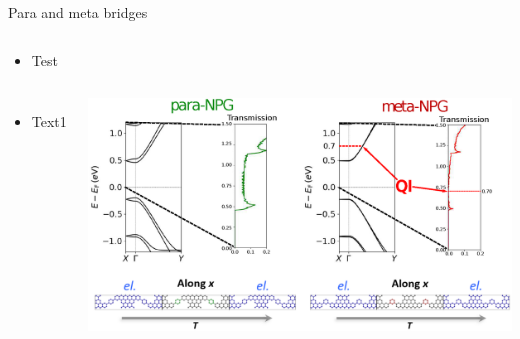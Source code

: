 \documentclass[hyperref={colorlinks=true,urlcolor=blue,linkcolor=.},aspectratio=1610,mathserif]{beamer}
\begin{document}
\begin{frame}{Para and meta bridges}
\begin{overprint}
\begin{columns}[t]
\end{columns}
    \begin{itemize}
        \item Test
    \end{itemize}
\begin{columns}[c]
        \begin{itemize}
            \item Text1
        \end{itemize}
    \includegraphics[height=.9\textwidth]{Figures/metapararesultdraft.eps}
\end{columns}
\end{overprint}
\end{frame}
\end{document}
